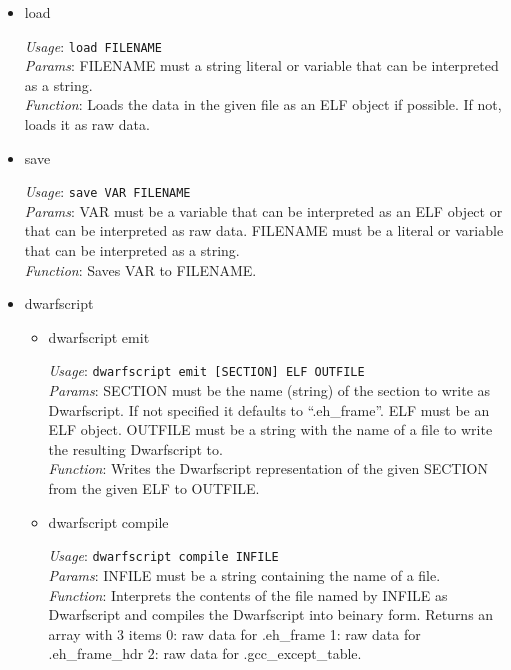 \documentclass[11pt]{article}
\begin{document}
\begin{itemize}

\item load\\
\label{sec-2.1.2.1}

     \emph{Usage}: \texttt{load FILENAME}\\
     \emph{Params}: FILENAME must a string literal or variable that can be interpreted
               as a string.\\
     \emph{Function}: Loads the data in the given file as an ELF object if
               possible. If not, loads it as raw data.

\item save\\
\label{sec-2.1.2.2}

     \emph{Usage}: \texttt{save VAR FILENAME}\\
     \emph{Params}: VAR must be a variable that can be interpreted as an ELF
               object or that can be interpreted as raw data. FILENAME must be a
               literal or variable that can be interpreted as a string.\\
     \emph{Function}: Saves VAR to FILENAME.

\item dwarfscript\\
\label{sec-2.1.2.3}

\begin{itemize}

\item dwarfscript emit\\
\label{sec-2.1.2.3.1}

      \emph{Usage}: \texttt{dwarfscript emit [SECTION] ELF OUTFILE}\\
      \emph{Params}: SECTION must be the name (string) of the section to write as
                Dwarfscript. If not specified it defaults to
                ``.eh\_{}frame''. ELF must be an ELF object. OUTFILE must
                be a string with the name of a file to write the resulting
                Dwarfscript to.\\
      \emph{Function}: Writes the Dwarfscript representation of the given
                  SECTION from the given ELF to OUTFILE.

\item dwarfscript compile\\
\label{sec-2.1.2.3.2}

      \emph{Usage}: \texttt{dwarfscript compile INFILE}\\
      \emph{Params}: INFILE must be a string containing the name of a file.\\
      \emph{Function}: Interprets the contents of the file named by INFILE
                  as Dwarfscript and compiles the Dwarfscript into
                  beinary form. Returns an array with 3 items
                  0: raw data for .eh\_{}frame 
                  1: raw data for .eh\_{}frame\_{}hdr
                  2: raw data for .gcc\_{}except\_{}table.
\end{itemize} %


\end{itemize}
\end{document}
